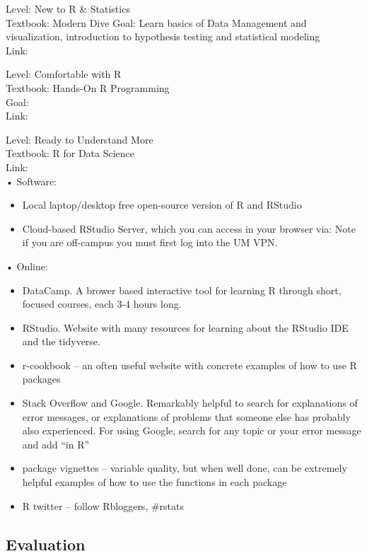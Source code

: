 \documentclass[
]{book}
\providecommand{\tightlist}{%
  \setlength{\itemsep}{0pt}\setlength{\parskip}{0pt}}
\begin{document}
Level: New to R \& Statistics\\
Textbook: Modern Dive
Goal: Learn basics of Data Management and visualization, introduction to hypothesis testing and statistical modeling\\
Link:

Level: Comfortable with R\\
Textbook: Hands-On R Programming\\
Goal:\\
Link:

Level: Ready to Understand More\\
Textbook: R for Data Science\\
Link:\\

• Software:

\begin{itemize}
\tightlist
\item
  Local laptop/desktop free open-source version of R and RStudio
\item
  Cloud-based RStudio Server, which you can access in your browser via:
  Note if you are off-campus you must first log into the UM VPN.
\end{itemize}

• Online:

\begin{itemize}
\tightlist
\item
  DataCamp. A brower based interactive tool for learning R through short, focused courses, each 3-4 hours long.
\item
  RStudio. Website with many resources for learning about the RStudio IDE and the tidyverse.
\item
  r-cookbook -- an often useful website with concrete examples of how to use R packages
\item
  Stack Overflow and Google. Remarkably helpful to search for explanations of error messages, or explanations of problems that someone else has probably also experienced. For using Google, search for any topic or your error message and add ``in R''
\item
  package vignettes -- variable quality, but when well done, can be extremely helpful examples of how to use the functions in each package
\item
  R twitter -- follow Rbloggers, \#rstats
\end{itemize}

\hypertarget{evaluation}{%
\subsection{Evaluation}\label{evaluation}}
\end{document}
